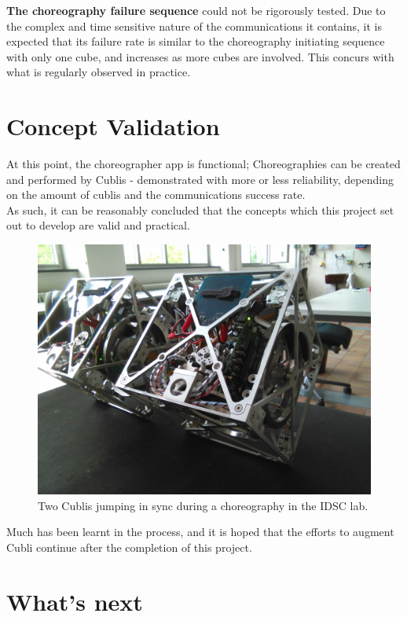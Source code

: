 \textbf{The choreography failure sequence} could not be rigorously tested. Due to the complex and time sensitive nature of the communications it contains, it is expected that its failure rate is similar to the choreography initiating sequence with only one cube, and increases as more cubes are involved. This concurs with what is regularly observed in practice.

\section{Concept Validation}

At this point, the choreographer app is functional; Choreographies can be created and performed by Cublis - demonstrated with more or less reliability, depending on the amount of cublis and the communications success rate.\\

As such, it can be reasonably concluded that the concepts which this project set out to develop are valid and practical.    

\begin{figure}[H]
   \centering
   \includegraphics[width=1\textwidth]{img/Performing.jpg}
   \caption{Two Cublis jumping in sync during a choreography in the IDSC lab.}
   \label{img:performing}
\end{figure}

Much has been learnt in the process, and it is hoped that the efforts to augment Cubli continue after the completion of this project.

\section{What's next}

